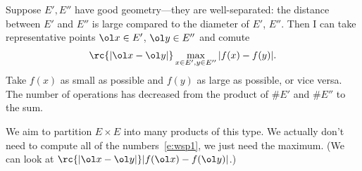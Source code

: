 Suppose $E',E''$ have good geometry---they are well-separated: the distance between $E'$ and $E''$ is large compared to the diameter of $E'$, $E''$. Then I can take representative points $\ol x\in E'$, $\ol y\in E''$ and comute
\begin{align}\label{e:wsp1}
\rc{|\ol x - \ol y|}\max_{x\in E',y\in E''} |f(x)-f(y)|. 
\end{align}
Take $f(x)$ as small as possible and $f(y)$ as large as possible, or vice versa. The number of operations has decreased from the product of $\# E'$ and $\# E''$ to the sum. 

We aim to partition $E\times E$ into many products of this type. We actually don't need to compute all of the numbers~\eqref{e:wsp1}, we just need the maximum. (We can look at $\rc{|\ol x-\ol y|}|f(\ol x)-f(\ol y)|$.)

